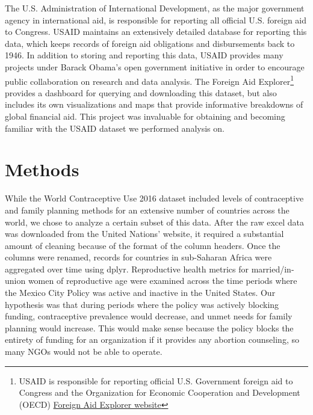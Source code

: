 \documentclass[11pt,]{article}
\begin{document}
The U.S. Administration of International Development, as the major
government agency in international aid, is responsible for reporting all
official U.S. foreign aid to Congress. USAID maintains an extensively
detailed database for reporting this data, which keeps records of
foreign aid obligations and disbursements back to 1946. In addition to
storing and reporting this data, USAID provides many projects under
Barack Obama's open government initiative in order to encourage public
collaboration on research and data analysis. The Foreign Aid
Explorer\footnote{USAID is responsible for reporting official U.S.
  Government foreign aid to Congress and the Organization for Economic
  Cooperation and Development (OECD)
  \href{https://explorer.usaid.gov/aid-dashboard.html}{Foreign Aid
  Explorer website}} provides a dashboard for querying and downloading
this dataset, but also includes its own visualizations and maps that
provide informative breakdowns of global financial aid. This project was
invaluable for obtaining and becoming familiar with the USAID dataset we
performed analysis on.

\section{Methods}\label{methods}

While the World Contraceptive Use 2016 dataset included levels of
contraceptive and family planning methods for an extensive number of
countries across the world, we chose to analyze a certain subset of this
data. After the raw excel data was downloaded from the United Nations'
website, it required a substantial amount of cleaning because of the
format of the column headers. Once the columns were renamed, records for
countries in sub-Saharan Africa were aggregated over time using dplyr.
Reproductive health metrics for married/in-union women of reproductive
age were examined across the time periods where the Mexico City Policy
was active and inactive in the United States. Our hypothesis was that
during periods where the policy was actively blocking funding,
contraceptive prevalence would decrease, and unmet needs for family
planning would increase. This would make sense because the policy blocks
the entirety of funding for an organization if it provides any abortion
counseling, so many NGOs would not be able to operate.
\end{document}
